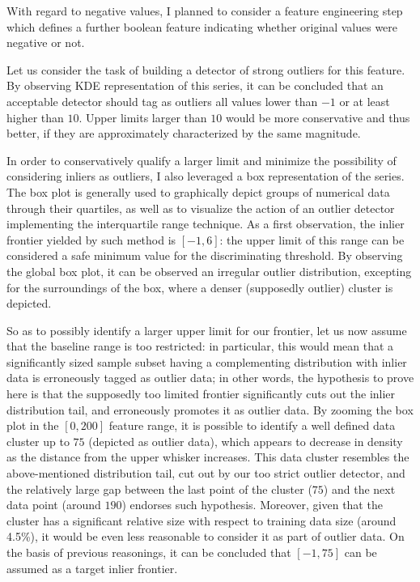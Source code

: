 \documentclass[preprint,12pt,3p]{elsarticle}
\begin{document}
With regard to negative values, I planned to consider a feature engineering step which defines a further boolean feature indicating whether original values were negative or not.

Let us consider the task of building a detector of strong outliers for this feature. By observing KDE representation of this series, it can be concluded that an acceptable detector should tag as outliers all values lower than $-1$ or at least higher than $10$. Upper limits larger than $10$ would be more conservative and thus better, if they are approximately characterized by the same magnitude.

In order to conservatively qualify a larger limit and minimize the possibility of considering inliers as outliers, I also leveraged a box representation of the series. The box plot is generally used to graphically depict groups of numerical data through their quartiles, as well as to visualize the action of an outlier detector implementing the interquartile range technique. As a first observation, the inlier frontier yielded by such method is $[-1,6]$: the upper limit of this range can be considered a safe minimum value for the discriminating threshold.
By observing the global box plot, it can be observed an irregular outlier distribution, excepting for the surroundings of the box, where a denser (supposedly outlier) cluster is depicted.

So as to possibly identify a larger upper limit for our frontier, let us now assume that the baseline range is too restricted: in particular, this would mean that a significantly sized sample subset having a complementing distribution with inlier data is erroneously tagged as outlier data; in other words, the hypothesis to prove here is that the supposedly too limited frontier significantly cuts out the inlier distribution tail, and erroneously promotes it as outlier data. 
By zooming the box plot in the $[0,200]$ feature range, it is possible to identify a well defined data cluster up to $75$ (depicted as outlier data), which appears to decrease in density as the distance from the upper whisker increases. This data cluster resembles the above-mentioned distribution tail, cut out by our too strict outlier detector, and the relatively large gap between the last point of the cluster ($75$) and the next data point (around $190$) endorses such hypothesis. Moreover, given that the cluster has a significant relative size with respect to training data size (around 4.5\%), it would be even less reasonable to consider it as part of outlier data. On the basis of previous reasonings, it can be concluded that $[-1,75]$ can be assumed as a target inlier frontier.
\end{document}
